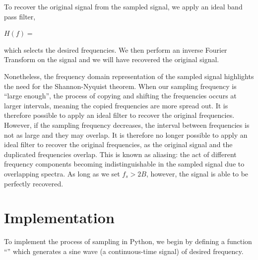 \documentclass{article}
\begin{document}
To recover the original signal from the sampled signal, we apply an ideal band pass filter,
\begin{center}
    \begin{math}
        H(f) = %
    \end{math}  
\end{center}
which selects the desired frequencies. We then perform an inverse Fourier Transform on the signal and we will have recovered the original signal. %

Nonetheless, the frequency domain representation of the sampled signal highlights the need for the Shannon-Nyquist theorem. %
When our sampling frequency is ``large enough'', the process of copying and shifting the frequencies occurs at larger intervals, meaning the copied frequencies are more spread out. It is therefore possible to apply an ideal filter to recover the original frequencies. %
However, if the sampling frequency decreases, the interval between frequencies is not as large and they may overlap. It is therefore no longer possible to apply an ideal filter to recover the original frequencies, as the original signal and the duplicated frequencies overlap.
This is known as aliasing: the act of different frequency components becoming indistinguishable in the sampled signal due to overlapping spectra. %
As long as we set $f_s > 2B$, however, the signal is able to be perfectly recovered. 



\section{Implementation}
To implement the process of sampling in Python, we begin by defining a function ``'' which generates a sine wave (a continuous-time signal) of desired frequency.
\end{document}
